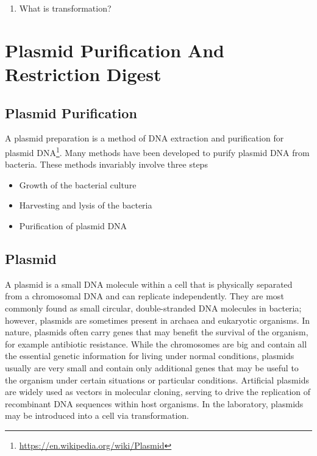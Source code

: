 \documentclass[]{book}
\providecommand{\tightlist}{%
  \setlength{\itemsep}{0pt}\setlength{\parskip}{0pt}}
\let\rmarkdownfootnote\footnote%
\def\footnote{\protect\rmarkdownfootnote}
\renewcommand{\href}[2]{#2\footnote{\url{#1}}}
\begin{document}
\begin{enumerate}
\def\labelenumi{\arabic{enumi}.}
\tightlist
\item
  What is transformation?
\end{enumerate}

\hypertarget{plasmid-purification-and-restriction-digest}{%
\chapter{Plasmid Purification And Restriction Digest}\label{plasmid-purification-and-restriction-digest}}

\hypertarget{plasmid-purification}{%
\section{Plasmid Purification}\label{plasmid-purification}}

A plasmid preparation is a method of DNA extraction and purification for \href{https://en.wikipedia.org/wiki/Plasmid}{plasmid DNA}. Many methods have been developed to purify plasmid DNA from bacteria. These methods invariably involve three steps

\begin{itemize}
\tightlist
\item
  Growth of the bacterial culture
\item
  Harvesting and lysis of the bacteria
\item
  Purification of plasmid DNA
\end{itemize}

\hypertarget{plasmid}{%
\section{Plasmid}\label{plasmid}}

A plasmid is a small DNA molecule within a cell that is physically separated from a chromosomal DNA and can replicate independently. They are most commonly found as small circular, double-stranded DNA molecules in bacteria; however, plasmids are sometimes present in archaea and eukaryotic organisms. In nature, plasmids often carry genes that may benefit the survival of the organism, for example antibiotic resistance. While the chromosomes are big and contain all the essential genetic information for living under normal conditions, plasmids usually are very small and contain only additional genes that may be useful to the organism under certain situations or particular conditions. Artificial plasmids are widely used as vectors in molecular cloning, serving to drive the replication of recombinant DNA sequences within host organisms. In the laboratory, plasmids may be introduced into a cell via transformation.
\end{document}
